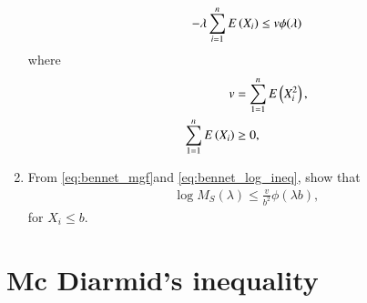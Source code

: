 \documentclass[journal,12pt,twocolumn]{IEEEtran}
\renewcommand\thesection{\arabic{section}}
\begin{document}
\begin{enumerate}[label=\thesection.\arabic*,ref=\thesection.\theenumi]
\begin{multline}
\\
- \lambda \sum_{i=1}^{n}E \left(X_i\right)
\le
v\phi (\lambda)
\end{multline}
%
where
\begin{align}
v &= \sum_{1=1}^{n} E \left(X_i^2\right),
\\
\sum_{1=1}^{n} E \left(X_i\right) & \ge 0,
\end{align}
\item From \eqref{eq:bennet_mgf}and \eqref{eq:bennet_log_ineq}, show that
\begin{align}
\log M_{S}(\lambda) \le \frac{v}{b^2}\phi(\lambda b),
\end{align}
for $X_i \le b$.
\end{enumerate}

\section{Mc Diarmid's inequality}
\end{document}
